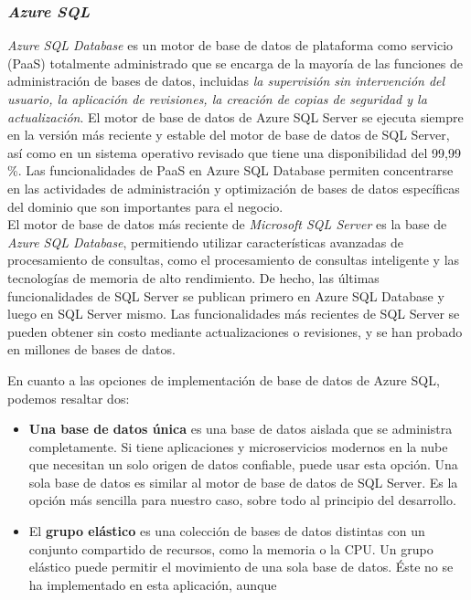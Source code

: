 \subsubsection{\textit{Azure SQL}}
\cite{AzureSQL}
\textit{Azure SQL Database} es un motor de base de datos de plataforma como servicio
(PaaS) totalmente administrado que se encarga de la mayoría de las funciones de
administración de bases de datos, incluidas \textit{la supervisión sin intervención del
usuario, la aplicación de revisiones, la creación de copias de seguridad y la
actualización}. El motor de base de datos de Azure SQL Server se ejecuta siempre
en la versión más reciente y estable del motor de base de datos de SQL Server,
así como en un sistema operativo revisado que tiene una disponibilidad del 99,99
\%. Las funcionalidades de PaaS en Azure SQL Database permiten concentrarse en
las actividades de administración y optimización de bases de datos específicas
del dominio que son importantes para el negocio.\\

El motor de base de datos más reciente de \textit{Microsoft SQL Server} es la base de
\textit{Azure SQL Database}, permitiendo utilizar características avanzadas de procesamiento de
consultas, como el procesamiento de consultas inteligente y las tecnologías de
memoria de alto rendimiento. De hecho, las últimas funcionalidades de SQL Server
se publican primero en Azure SQL Database y luego en SQL Server mismo. Las
funcionalidades más recientes de SQL Server se pueden obtener sin costo mediante
actualizaciones o revisiones, y se han probado en millones de bases de datos.


En cuanto a las opciones de implementación de base de datos de Azure SQL, podemos resaltar dos:
\begin{itemize}
    \item \textbf{Una base de datos única} es una base de datos aislada que se
    administra completamente. Si tiene aplicaciones y microservicios modernos en
    la nube que necesitan un solo origen de datos confiable, puede usar esta
    opción. Una sola base de datos es similar al motor de base de datos de SQL
    Server. Es la opción más sencilla para nuestro caso, sobre todo al principio
    del desarrollo.
    \item El \textbf{grupo elástico} es una colección de bases de datos distintas con un
    conjunto compartido de recursos, como la memoria o la CPU. Un grupo elástico
    puede permitir el movimiento de una sola base de datos. Éste no se ha implementado en esta aplicación, aunque 
\end{itemize}


    